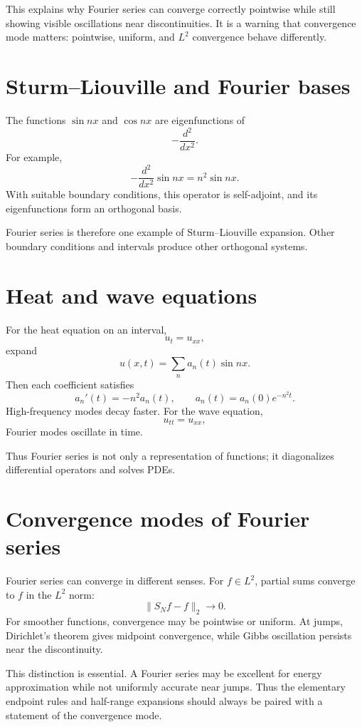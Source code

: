 This explains why Fourier series can converge correctly pointwise while still showing visible oscillations near discontinuities.  It is a warning that convergence mode matters: pointwise, uniform, and $L^2$ convergence behave differently.

\section{Sturm--Liouville and Fourier bases}

The functions $\sin nx$ and $\cos nx$ are eigenfunctions of
\[
  -\frac{d^2}{dx^2}.
\]
For example,
\[
  -\frac{d^2}{dx^2}\sin nx=n^2\sin nx.
\]
With suitable boundary conditions, this operator is self-adjoint, and its eigenfunctions form an orthogonal basis.

Fourier series is therefore one example of Sturm--Liouville expansion.  Other boundary conditions and intervals produce other orthogonal systems.

\section{Heat and wave equations}

For the heat equation on an interval,
\[
  u_t=u_{xx},
\]
expand
\[
  u(x,t)=\sum_{n} a_n(t)\sin nx.
\]
Then each coefficient satisfies
\[
  a_n'(t)=-n^2a_n(t),\qquad a_n(t)=a_n(0)e^{-n^2t}.
\]
High-frequency modes decay faster.  For the wave equation,
\[
  u_{tt}=u_{xx},
\]
Fourier modes oscillate in time.

Thus Fourier series is not only a representation of functions; it diagonalizes differential operators and solves PDEs.

\section{Convergence modes of Fourier series}

Fourier series can converge in different senses.  For $f\in L^2$, partial sums converge to $f$ in the $L^2$ norm:
\[
  \|S_Nf-f\|_2\to0.
\]
For smoother functions, convergence may be pointwise or uniform.  At jumps, Dirichlet's theorem gives midpoint convergence, while Gibbs oscillation persists near the discontinuity.

This distinction is essential.  A Fourier series may be excellent for energy approximation while not uniformly accurate near jumps.  Thus the elementary endpoint rules and half-range expansions should always be paired with a statement of the convergence mode.

